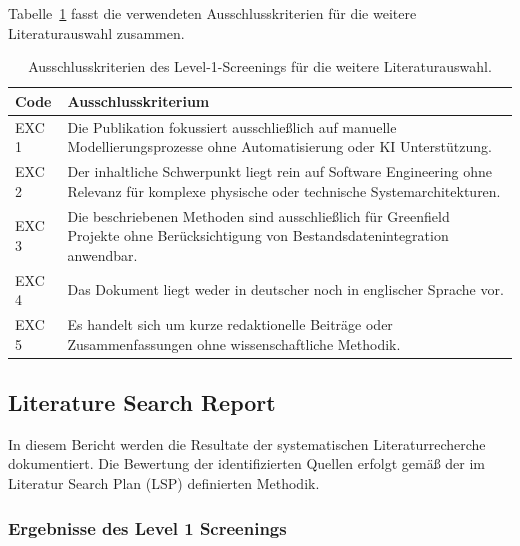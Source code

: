 Tabelle~\ref{tab:exc_criteria} fasst die verwendeten Ausschlusskriterien
für die weitere Literaturauswahl zusammen.
\begin{table}[h]
\caption[Ausschlusskriterien des Level-1-Screenings]{
Ausschlusskriterien des Level-1-Screenings für die weitere Literaturauswahl.}
\label{tab:exc_criteria}
\centering
\begin{tabular}{|l|p{10cm}|}
\hline
\textbf{Code} & \textbf{Ausschlusskriterium} \\ \hline
EXC 1 & Die Publikation fokussiert ausschließlich auf manuelle Modellierungsprozesse ohne Automatisierung oder KI Unterstützung. \\ \hline
EXC 2 & Der inhaltliche Schwerpunkt liegt rein auf Software Engineering ohne Relevanz für komplexe physische oder technische Systemarchitekturen. \\ \hline
EXC 3 & Die beschriebenen Methoden sind ausschließlich für Greenfield Projekte ohne Berücksichtigung von Bestandsdatenintegration anwendbar. \\ \hline
EXC 4 & Das Dokument liegt weder in deutscher noch in englischer Sprache vor. \\ \hline
EXC 5 & Es handelt sich um kurze redaktionelle Beiträge oder Zusammenfassungen ohne wissenschaftliche Methodik. \\ \hline
\end{tabular}
\end{table}

\subsection{Literature Search Report}
\label{app:lsr}


In diesem Bericht werden die Resultate der systematischen Literaturrecherche dokumentiert. Die Bewertung der identifizierten Quellen erfolgt gemäß der im Literatur Search Plan (LSP) definierten Methodik.

\subsubsection{Ergebnisse des Level 1 Screenings}

